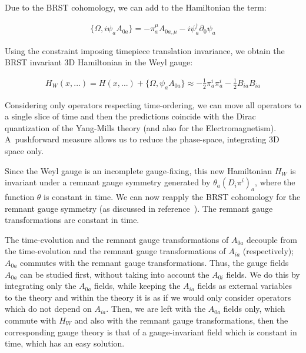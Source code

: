 \documentclass[11pt]{book}
\begin{document}
Due to the BRST cohomology, we can add to the Hamiltonian the term:

\begin{equation}\begin{aligned}
    \{\Omega, i \psi_{a} A_{0 a}\}=-\pi^{\mu}_{a}A_{0 a, \mu}-i\psi^\dagger_{a}\partial_0\psi_{a}\end{aligned}\end{equation}

Using the constraint imposing timepiece translation invariance, we
obtain the BRST invariant 3D Hamiltonian in the Weyl gauge:

\begin{equation}\begin{aligned}
    H_W(x,...)=H(x,...)+\{\Omega,\psi_a A_{0 a} \}\approx-\frac{1}{2}\pi^i_a \pi^i_a-\frac{1}{2} B_{i a} B_{i a}\end{aligned}\end{equation}

Considering only operators respecting time-ordering, we can move all
operators to a single slice of time and then the predictions coincide
with the Dirac quantization of the Yang-Mills theory (and also for the
Electromagnetism). A~pushforward measure allows us to reduce the
phase-space, integrating 3D space only.

Since the Weyl gauge is an incomplete gauge-fixing, this new Hamiltonian
\(H_W\) is invariant under a remnant gauge symmetry generated by
\(\theta_a (D_i \pi^i)_{a}\), where the function \(\theta\) is constant
in time. We can now reapply the BRST cohomology for the remnant gauge
symmetry (as discussed in
reference~\cite{McKeon2015Ghosts}). The
remnant gauge transformations are constant in time.

The time-evolution and the remnant gauge transformations of \(A_{0 a}\)
decouple from the time-evolution and the remnant gauge transformations
of \(A_{i a}\) (respectively); \(A_{0 a}\) commutes with the remnant
gauge transformations. Thus, the gauge fields \(A_{0 a}\) can be studied
first, without taking into account the \(A_{0 i}\) fields. We do this by
integrating only the \(A_{0 a}\) fields, while keeping the \(A_{i a}\)
fields as external variables to the theory and within the theory it is
as if we would only consider operators which do not depend on
\(A_{i a}\). Then, we are left with the \(A_{0 a}\) fields only, which
commute with \(H_W\) and also with the remnant gauge transformations,
then the corresponding gauge theory is that of a gauge-invariant field
which is constant in time, which has an easy solution.
\end{document}

